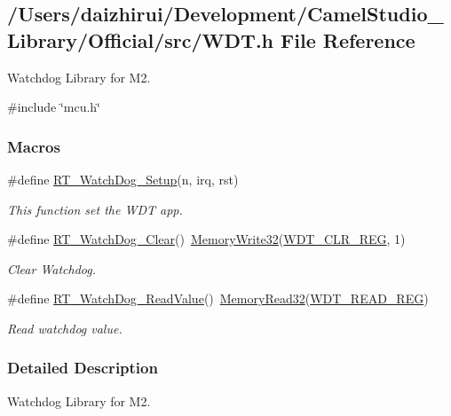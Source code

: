 \hypertarget{a00179}{}\subsection{/\+Users/daizhirui/\+Development/\+Camel\+Studio\+\_\+\+Library/\+Official/src/\+W\+DT.h File Reference}
\label{a00179}


Watchdog Library for M2.  


{\ttfamily \#include \char`\"{}mcu.\+h\char`\"{}}\newline
\subsubsection*{Macros}
\begin{DoxyCompactItemize}
\item 
\#define \mbox{\hyperlink{a00179_a369b51538a0ccf57dcdb30e12352a8c7}{R\+T\+\_\+\+Watch\+Dog\+\_\+\+Setup}}(n,  irq,  rst)
\begin{DoxyCompactList}\small\item\em This function set the W\+DT app. \end{DoxyCompactList}\item 
\#define \mbox{\hyperlink{a00179_ae976b2fe76d4b216e68a771068434abc}{R\+T\+\_\+\+Watch\+Dog\+\_\+\+Clear}}()~\mbox{\hyperlink{a00068_a6b9732365b12e48ddb89fe1028b975b0}{Memory\+Write32}}(\mbox{\hyperlink{a00068_a2560b8d7465c0ee0112852677004099f}{W\+D\+T\+\_\+\+C\+L\+R\+\_\+\+R\+EG}}, 1)
\begin{DoxyCompactList}\small\item\em Clear Watchdog. \end{DoxyCompactList}\item 
\#define \mbox{\hyperlink{a00179_acdfc8b8f0bddfd7382d49a22a92a5930}{R\+T\+\_\+\+Watch\+Dog\+\_\+\+Read\+Value}}()~\mbox{\hyperlink{a00068_a2d484dc15bdf30ee11ab3b05f31f0e16}{Memory\+Read32}}(\mbox{\hyperlink{a00068_ab04902f3d750cf4826ded8350ad5adac}{W\+D\+T\+\_\+\+R\+E\+A\+D\+\_\+\+R\+EG}})
\begin{DoxyCompactList}\small\item\em Read watchdog value. \end{DoxyCompactList}\end{DoxyCompactItemize}


\subsubsection{Detailed Description}
Watchdog Library for M2. 

